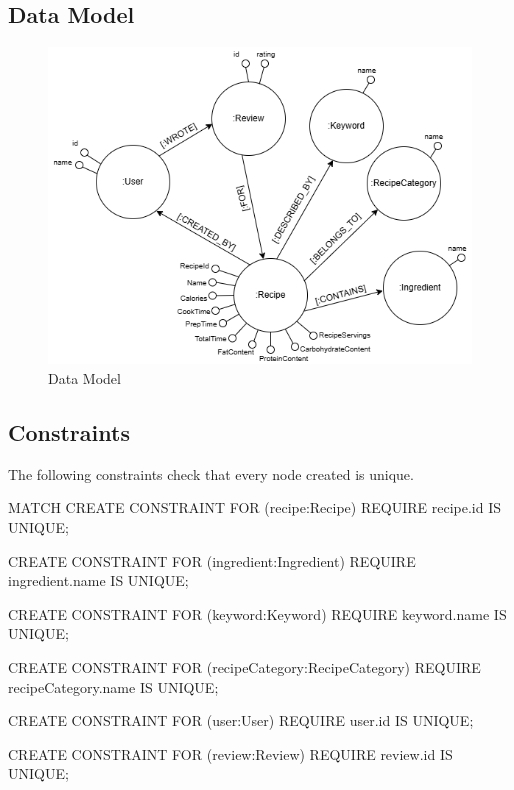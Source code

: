 \subsection{Data Model}
\begin{figure}[H]
    \centering
    \includegraphics[width=\linewidth]{Report/ReportLatex/Images/Neo4J/graph.png}
    \caption{Data Model}
    \label{fig:enter-label}
    \end{figure}
\subsection{Constraints}
The following constraints check that every node created is unique.
\begin{CypherQuery}
MATCH
CREATE CONSTRAINT FOR (recipe:Recipe) REQUIRE recipe.id IS UNIQUE;

CREATE CONSTRAINT FOR (ingredient:Ingredient) 
REQUIRE ingredient.name IS UNIQUE;

CREATE CONSTRAINT FOR (keyword:Keyword) REQUIRE keyword.name IS UNIQUE;

CREATE CONSTRAINT FOR (recipeCategory:RecipeCategory)
REQUIRE recipeCategory.name IS UNIQUE;

CREATE CONSTRAINT FOR (user:User) REQUIRE user.id IS UNIQUE;

CREATE CONSTRAINT FOR (review:Review) REQUIRE review.id IS UNIQUE;

\end{CypherQuery}
